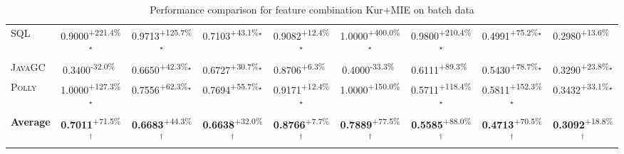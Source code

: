 \begin{table}[htbp]
\begin{tabular}{l|cccc|cccc}
\textsc{SQL} & \cellcolor{green!30}0.9000\textsuperscript{+221.4\%}$^\star$ & \cellcolor{green!30}0.9713\textsuperscript{+125.7\%}$^\star$ & \cellcolor{green!30}0.7103\textsuperscript{+43.1\%}$^\star$ & \cellcolor{green!30}0.9082\textsuperscript{+12.4\%}$^\star$ & \cellcolor{green!30}1.0000\textsuperscript{+400.0\%}$^\star$ & \cellcolor{green!30}0.9800\textsuperscript{+210.4\%}$^\star$ & \cellcolor{green!30}0.4991\textsuperscript{+75.2\%}$^\star$ & \cellcolor{green!30}0.2980\textsuperscript{+13.6\%}$^{\,\,\,}$ \\
\textsc{JavaGC} & \cellcolor{red!30}0.3400\textsuperscript{-32.0\%}$^{\,\,\,}$ & \cellcolor{green!30}0.6650\textsuperscript{+42.3\%}$^\star$ & \cellcolor{green!30}0.6727\textsuperscript{+30.7\%}$^\star$ & \cellcolor{green!30}0.8706\textsuperscript{+6.3\%}$^{\,\,\,}$ & \cellcolor{red!30}0.4000\textsuperscript{-33.3\%}$^{\,\,\,}$ & \cellcolor{green!30}0.6111\textsuperscript{+89.3\%}$^{\,\,\,}$ & \cellcolor{green!30}0.5430\textsuperscript{+78.7\%}$^\star$ & \cellcolor{green!30}0.3290\textsuperscript{+23.8\%}$^\star$ \\
\textsc{Polly} & \cellcolor{green!30}1.0000\textsuperscript{+127.3\%}$^\star$ & \cellcolor{green!30}0.7556\textsuperscript{+62.3\%}$^\star$ & \cellcolor{green!30}0.7694\textsuperscript{+55.7\%}$^\star$ & \cellcolor{green!30}0.9171\textsuperscript{+12.4\%}$^\star$ & \cellcolor{green!30}1.0000\textsuperscript{+150.0\%}$^{\,\,\,}$ & \cellcolor{green!30}0.5711\textsuperscript{+118.4\%}$^\star$ & \cellcolor{green!30}0.5811\textsuperscript{+152.3\%}$^\star$ & \cellcolor{green!30}0.3432\textsuperscript{+33.1\%}$^\star$ \\
\hline
\textbf{Average} & \cellcolor{green!30}\textbf{0.7011}\textsuperscript{+71.5\%}$^\dagger$ & \cellcolor{green!30}\textbf{0.6683}\textsuperscript{+44.3\%}$^\dagger$ & \cellcolor{green!30}\textbf{0.6638}\textsuperscript{+32.0\%}$^\dagger$ & \cellcolor{green!30}\textbf{0.8766}\textsuperscript{+7.7\%}$^\dagger$ & \cellcolor{green!30}\textbf{0.7889}\textsuperscript{+77.5\%}$^\dagger$ & \cellcolor{green!30}\textbf{0.5585}\textsuperscript{+88.0\%}$^\dagger$ & \cellcolor{green!30}\textbf{0.4713}\textsuperscript{+70.5\%}$^\dagger$ & \cellcolor{green!30}\textbf{0.3092}\textsuperscript{+18.8\%}$^\dagger$ \\
\hline
\end{tabular}
\caption{Performance comparison for feature combination Kur+MIE on batch data}
\label{tab:combo_Kur_MIE_performance_batch}
\end{table}